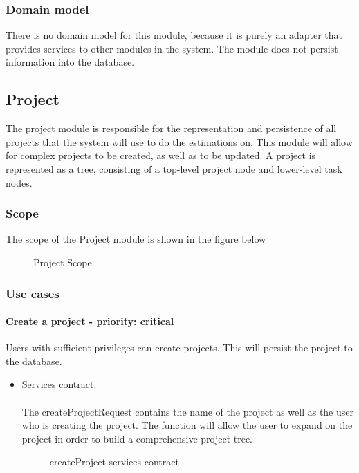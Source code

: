\subsubsection{Domain model}
There is no domain model for this module, because it is purely an adapter that provides services to other modules in the system. The module does not persist information into the database.

\subsection{Project}
The project module is responsible for the representation and persistence of all projects that the system will use to do the estimations on. This module will allow for complex projects to be created, as well as to be updated. A project is represented as a tree, consisting of a top-level project node and lower-level task nodes.

\subsubsection{Scope}
The scope of the Project module is shown in the figure below
	\begin{figure}[H]
	    	\centering
	    	\caption{Project Scope}
	    	\label{fig:Project_Scope}
   	\end{figure}
\subsubsection{Use cases}

\paragraph{Create a project - priority: critical}
Users with sufficient privileges can create projects. This will persist the project to the database.

\begin{itemize}
	\item Services contract:\\ \\
	The createProjectRequest contains the name of the project as well as the user who is creating the project. The function will allow the user to expand on the project in order to build a comprehensive project tree.
	\begin{figure}[H]
    	\centering
    	\caption{createProject services contract}
    	\label{fig:createProject_services_contract}
   	\end{figure}
\end{itemize}

